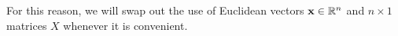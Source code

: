 \begin{applicationActivities}{1}{21}
\begin{observation}
For this reason, we will swap out the use of Euclidean vectors
\(\mathbf x\in\mathbb{R}^n\) and \(n\times 1\) matrices \(X\) whenever it is
convenient.
\end{observation}

\end{applicationActivities}
